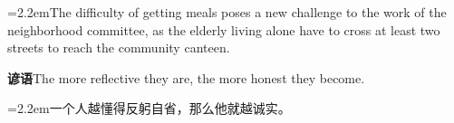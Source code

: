 \documentclass[11pt,a4paper]{article}
\newcommand{\num}[1]{\makebox[1.9em][r]{#1.}\hspace{0.3em}}
\begin{document}
\vspace{0.15em}

\noindent\hangindent=2.2em\hspace{2.2em}The difficulty of getting meals poses a new challenge to the work of the neighborhood committee, as the elderly living alone have to cross at least two streets to reach the community canteen.

\vspace{0.4em}\noindent{\color{rulegray}\rule{\textwidth}{0.6pt}}\vspace{0.4em}

\num{5}\textbf{谚语}\quad The more reflective they are, the more honest they become.

\vspace{0.15em}

\noindent\hangindent=2.2em\hspace{2.2em}一个人越懂得反躬自省，那么他就越诚实。
\end{document}
